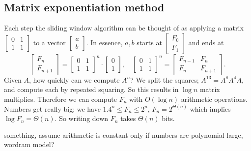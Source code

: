 \subsection{Matrix exponentiation method}
Each step the sliding window algorithm can be thought of as applying a matrix $\left[ 
    \begin{smallmatrix}
        0 & 1 \\ 1 & 1
    \end{smallmatrix}\right] $ to a vector $\left[ 
\begin{smallmatrix}
    a \\b
\end{smallmatrix}\right] $. In essence, $a,b$ starts at $\left[ 
\begin{smallmatrix}
    F_0 \\ F_1
\end{smallmatrix}\right] $ and ends at  \[
\begin{bmatrix}
    F_n \\ F_{n+1}
\end{bmatrix}= 
\begin{bmatrix}
    0 & 1 \\ 1 & 1
\end{bmatrix}^n  \cdot 
\begin{bmatrix}
    0 \\ 1
\end{bmatrix}, \quad 
\begin{bmatrix}
    0 & 1 \\ 1  & 1
\end{bmatrix}^n  = 
\begin{bmatrix}
    F_{n-1} & F_n \\F_n  & F_{n+1}
\end{bmatrix}.
\] Given $A$, how quickly can we compute $A^n $? We split the squares; $A^{13}=A^{8}A^4A$, and compute each by repeated squaring. So this results in $\log n$ matrix multiplies. Therefore we can compute $F_n $ with $O( \log n)$ arithmetic operations. Numbers get really big; we have $1.4^n  \leq F_n  \leq 2^n $, $F_n =2 ^{\Theta(n)}$ which implies $\log F_n =\Theta(n)$. So writing down $F_n $ takes $\Theta(n)$ bits.

something, assume arithmetic is constant only if numbers are polynomial large, wordram model?
